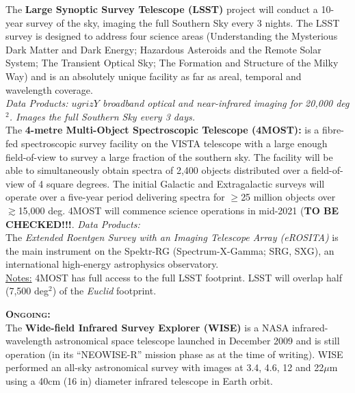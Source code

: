 \begin{framed}
The {\bf Large Synoptic Survey Telescope (LSST)} project will conduct
a 10-year survey of the sky, imaging the full Southern Sky every 3
nights. The LSST survey is designed to address four science areas
(Understanding the Mysterious Dark Matter and Dark Energy; Hazardous
Asteroids and the Remote Solar System; The Transient Optical Sky; The
Formation and Structure of the Milky Way) and is an absolutely unique
facility as far as areal, temporal and wavelength coverage.\\
{\it Data Products: $ugrizY$ broadband optical and near-infrared imaging for 20,000 deg$^2$. 
Images the full Southern Sky every 3 days. } \\

The {\bf 4-metre Multi-Object Spectroscopic Telescope (4MOST):} is a
fibre-fed spectroscopic survey facility on the VISTA telescope with a
large enough field-of-view to survey a large fraction of the southern
sky. The facility will be able to simultaneously obtain spectra of
2,400 objects distributed over a field-of-view of 4 square degrees.
The initial Galactic and Extragalactic surveys will operate over a
five-year period delivering spectra for $\geq$25 million objects over
$\gtrsim$15,000 deg. 4MOST will commence science operations in
mid-2021 ({\bf TO BE CHECKED!!!}.  {\it Data Products: } \\

The {\it Extended Roentgen Survey with an Imaging Telescope Array (eROSITA)} is the main instrument on the 
Spektr-RG (Spectrum-X-Gamma; SRG, SXG), an international high-energy astrophysics observatory. \\

\underline{Notes:}  4MOST has full access to the full LSST footprint. LSST will overlap half (7,500 deg$^2$) of the {\it Euclid} footprint. \\

\hrulefill 

\noindent
\textbf{\textsc{Ongoing:}} \\

The {\bf Wide-field Infrared Survey Explorer (WISE)} is a NASA
infrared-wavelength astronomical space telescope launched in December
2009 and is still operation (in its ``NEOWISE-R'' mission phase as at
the time of writing). WISE performed an all-sky astronomical survey
with images at 3.4, 4.6, 12 and 22$\mu$m using a 40cm (16 in) diameter
infrared telescope in Earth orbit. \\


\end{framed}

